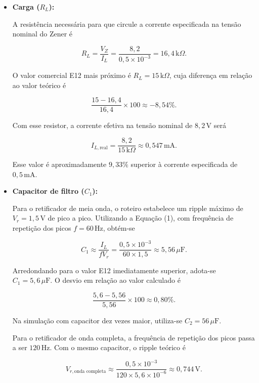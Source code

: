 \documentclass[11pt,a4paper]{article}
\begin{document}
\begin{itemize}

    \item \textbf{Carga ($R_L$):}

    A resistência necessária para que circule a corrente especificada
    na tensão nominal do Zener é

    \[
        R_L=\frac{V_Z}{I_L}
        =\frac{8{,}2}{0{,}5\times10^{-3}}
        =16{,}4\,\text{k}\Omega.
    \]

    O valor comercial E12 mais próximo é
    $R_L=15\,\text{k}\Omega$, cuja diferença em relação ao valor
    teórico é

    \[
        \frac{15-16{,}4}{16{,}4}\times100
        \approx -8{,}54\%.
    \]

    Com esse resistor, a corrente efetiva na tensão nominal de
    $8{,}2\,\text{V}$ será

    \[
        I_{L,\text{real}}=\frac{8{,}2}{15\,\text{k}\Omega}
        \approx0{,}547\,\text{mA}.
    \]

    Esse valor é aproximadamente $9{,}33\%$ superior à corrente
    especificada de $0{,}5\,\text{mA}$.

    \item \textbf{Capacitor de filtro ($C_1$):}

    Para o retificador de meia onda, o roteiro estabelece um ripple
    máximo de $V_r=1{,}5\,\text{V}$ de pico a pico. Utilizando
    a Equação (1), com frequência de repetição dos picos
    $f=60\,\text{Hz}$, obtém-se

    \[
        C_1\approx\frac{I_L}{fV_r}
        =\frac{0{,}5\times10^{-3}}{60\times1{,}5}
        \approx5{,}56\,\mu\text{F}.
    \]

    Arredondando para o valor E12 imediatamente superior, adota-se
    $C_1=5{,}6\,\mu\text{F}$. O desvio em relação ao valor calculado
    é

    \[
        \frac{5{,}6-5{,}56}{5{,}56}\times100
        \approx0{,}80\%.
    \]

    Na simulação com capacitor dez vezes maior, utiliza-se
    $C_2=56\,\mu\text{F}$.

    Para o retificador de onda completa, a frequência de repetição
    dos picos passa a ser $120\,\text{Hz}$. Com o mesmo capacitor,
    o ripple teórico é

    \[
        V_{r,\text{onda completa}}
        \approx\frac{0{,}5\times10^{-3}}
        {120\times5{,}6\times10^{-6}}
        \approx0{,}744\,\text{V}.
    \]


\end{itemize}
\end{document}
